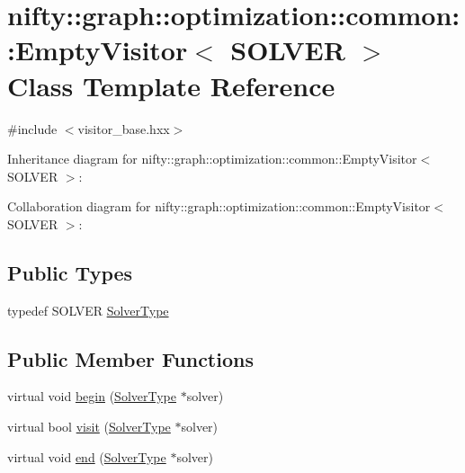 \hypertarget{classnifty_1_1graph_1_1optimization_1_1common_1_1EmptyVisitor}{}\section{nifty\+:\+:graph\+:\+:optimization\+:\+:common\+:\+:Empty\+Visitor$<$ S\+O\+L\+V\+E\+R $>$ Class Template Reference}
\label{classnifty_1_1graph_1_1optimization_1_1common_1_1EmptyVisitor}


{\ttfamily \#include $<$visitor\+\_\+base.\+hxx$>$}



Inheritance diagram for nifty\+:\+:graph\+:\+:optimization\+:\+:common\+:\+:Empty\+Visitor$<$ S\+O\+L\+V\+E\+R $>$\+:


Collaboration diagram for nifty\+:\+:graph\+:\+:optimization\+:\+:common\+:\+:Empty\+Visitor$<$ S\+O\+L\+V\+E\+R $>$\+:
\subsection*{Public Types}
\begin{DoxyCompactItemize}
\item 
typedef S\+O\+L\+V\+E\+R \hyperlink{classnifty_1_1graph_1_1optimization_1_1common_1_1EmptyVisitor_adc8b10f2bbb4a7ec75744676ce6ed05d}{Solver\+Type}
\end{DoxyCompactItemize}
\subsection*{Public Member Functions}
\begin{DoxyCompactItemize}
\item 
virtual void \hyperlink{classnifty_1_1graph_1_1optimization_1_1common_1_1EmptyVisitor_a5d0f0781404463df31cc24c7f08396fb}{begin} (\hyperlink{classnifty_1_1graph_1_1optimization_1_1common_1_1VisitorBase_a233e657d5334c972e39a44ac675f6e85}{Solver\+Type} $\ast$solver)
\item 
virtual bool \hyperlink{classnifty_1_1graph_1_1optimization_1_1common_1_1EmptyVisitor_a31ec5e330004b35450496495f94075cd}{visit} (\hyperlink{classnifty_1_1graph_1_1optimization_1_1common_1_1VisitorBase_a233e657d5334c972e39a44ac675f6e85}{Solver\+Type} $\ast$solver)
\item 
virtual void \hyperlink{classnifty_1_1graph_1_1optimization_1_1common_1_1EmptyVisitor_abb1ba16f53683fcc1a60c4bf94fbcfc2}{end} (\hyperlink{classnifty_1_1graph_1_1optimization_1_1common_1_1VisitorBase_a233e657d5334c972e39a44ac675f6e85}{Solver\+Type} $\ast$solver)
\end{DoxyCompactItemize}


